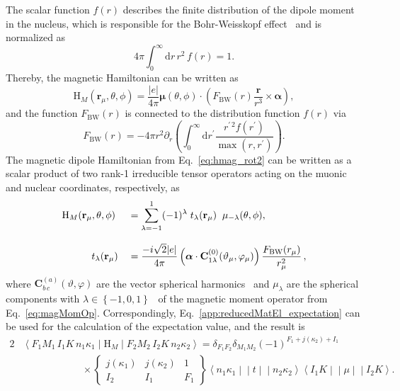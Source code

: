 The scalar function $f(r)$ describes the finite distribution of the dipole moment in the nucleus, which is responsible for the Bohr-Weisskopf effect~\cite{bohrWeisskopf1950} and is normalized as
\begin{equation}
4\pi\int_0^\infty \text{d}r\,r^2\,f(r)=1.
\end{equation}
Thereby, the magnetic Hamiltonian can be written as
\begin{equation}
\label{eq:hmag_rot2}
\text{H}_M(\mathbf{r}_\mu,\theta,\phi) =\frac{|e|}{4\pi}\boldsymbol{\mu}(\theta,\phi)\cdot
\left( F_{\text{BW}}(r)\frac{\mathbf{r}}{r^3}\times \boldsymbol{\alpha}\right),
\end{equation}
and the function $F_{\text{BW}}(r)$ is connected to the distribution function $f(r)$ via
\begin{equation}
F_{\text{BW}}(r)=-4\pi r^2\partial_r \left(\int_0^\infty\text{d}r^\prime \frac{r^{\prime\,2}f(r^\prime)}{\max (r,r^\prime)}\right).
\end{equation}
The magnetic dipole Hamiltonian from Eq.~\eqref{eq:hmag_rot2} can be written as a scalar product of two rank-1 irreducible tensor operators acting on the muonic and nuclear coordinates, respectively, as~\cite{johnson2007}
\begin{alignat}{2}
&\text{H}_M  (\mathbf{r}_\mu,\theta,\phi) &&=\sum_{\lambda=-1}^1 (-1)^\lambda \;t_\lambda(\mathbf{r}_\mu) \;\;\mu_{-\lambda}(\theta,\phi),\notag\\[7.5pt]
&\qquad \quad t_\lambda(\mathbf{r}_\mu) &&= \frac{-i\sqrt{2}|e|}{4\pi}\left(\boldsymbol{\alpha}\cdot\mathbf{C}^{(0)}_{1\lambda}(\vartheta_\mu,\varphi_\mu)\right)\frac{F_{\text{BW}}(r_\mu)}{r_\mu^2}\,\notag,
\end{alignat}
where $\mathbf{C}^{(a)}_{b\,c}(\vartheta,\varphi)$ are the vector spherical harmonics~\cite[Section 7.]{varshalovich1988} and $\mu_\lambda$ are the spherical components with $\lambda \in \left\{-1,0,1\right\}$~\cite[Section 1.]{varshalovich1988} of the magnetic moment operator from Eq.~\eqref{eq:magMomOp}. Correspondingly, Eq.~\eqref{app:reducedMatEl_expectation} can be used for the calculation of the expectation value, and the result is
\begin{alignat}{2}
& \left<F_1M_1\,I_1K\,n_1\kappa_1 \middle|\text{H}_M \middle|F_2M_2\,I_2K\,n_2\kappa_2 \right> = \delta_{F_1F_2}\delta_{M_1M_2}(-1)^{F_1+j(\kappa_2)+I_1}\\[7.5pt]
&\qquad\qquad\qquad\times
\begin{Bmatrix}
j(\kappa_1)&j(\kappa_2)&1\\
I_2&I_1&F_1
\end{Bmatrix}
\left< n_1\kappa_1\middle|\middle|t \middle|\middle| n_2\kappa_2\right>
\left< I_1K\middle|\middle|\mu \middle|\middle|I_2K\right>.
\end{alignat}
